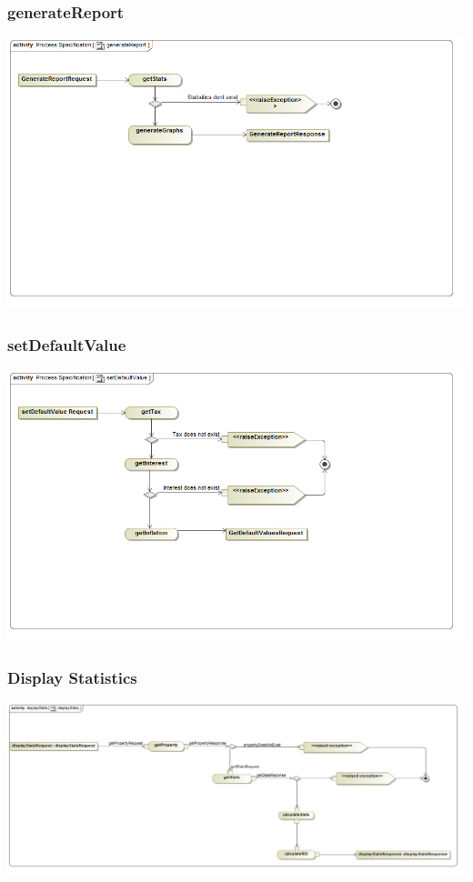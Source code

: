\documentclass[a4paper,12pt]{article}
\begin{document}
\subsubsection{generateReport}
\includegraphics[width=1\textwidth]{./Images/processSpecification/generateReport.png}
\subsubsection{setDefaultValue}
\includegraphics[width=1\textwidth]{./Images/processSpecification/setDefaultValue.png}

\subsubsection{Display Statistics}
\includegraphics[width=1\textwidth]{./Images/processSpecification/displayStatsActivity.jpg}
\end{document}
